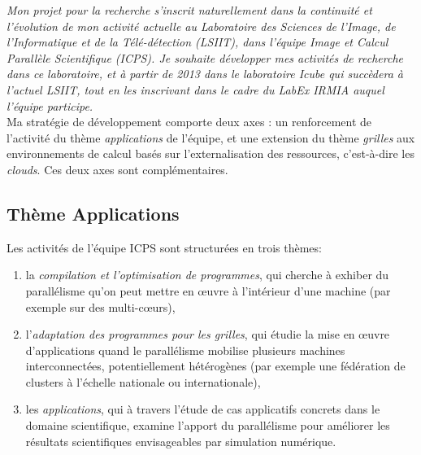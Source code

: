 \documentclass[11pt]{article}
\begin{document}
\textit{%
Mon projet pour la recherche s'inscrit naturellement dans la continuité et 
l'évolution de mon activité actuelle au Laboratoire des Sciences de l'Image,
de l'Informatique et de la Télé-détection (LSIIT), dans l'équipe Image et
Calcul Parallèle Scientifique (ICPS). Je souhaite développer mes activités 
de recherche dans ce laboratoire, et à partir de  2013 dans le laboratoire 
Icube qui succèdera à l'actuel LSIIT, tout en les inscrivant dans le cadre
du LabEx IRMIA auquel l'équipe participe.}\\

Ma stratégie de développement comporte deux axes : un renforcement de 
l'activité du thème \textit{applications} de l'équipe, et une extension
du thème \textit{grilles} aux environnements de calcul basés sur 
l'externalisation des ressources, c'est-à-dire les \emph{clouds}. Ces deux
axes sont complémentaires.


\subsection*{Thème Applications}
Les activités de l'équipe ICPS sont structurées en trois thèmes: 
\begin{enumerate}
\item la \textit{compilation et l'optimisation de programmes}, qui 
cherche à exhiber du parallélisme qu'on peut mettre en {\oe}uvre à 
l'intérieur d'une machine (par exemple sur des multi-c{\oe}urs),
\item l'\textit{adaptation des programmes pour les grilles}, qui 
étudie la mise en {\oe}uvre d'applications quand le parallélisme mobilise 
plusieurs machines interconnectées, potentiellement hétérogènes (par 
exemple une fédération de clusters à l'échelle nationale ou internationale), 
\item les \textit{applications}, qui à travers l'étude de cas 
applicatifs concrets dans le domaine scientifique, examine 
l'apport du parallélisme pour améliorer les résultats scientifiques
envisageables par simulation  numérique.
\end{enumerate}
\end{document}
